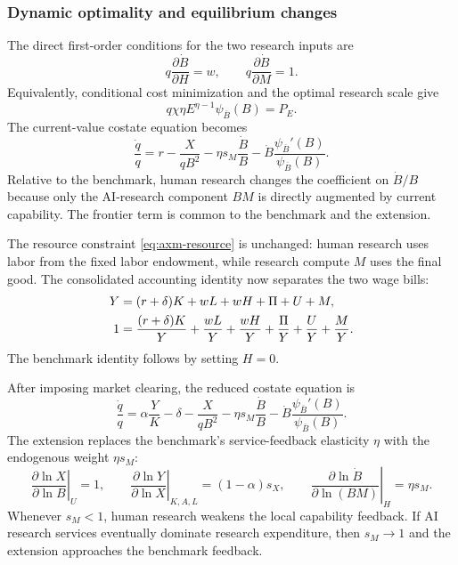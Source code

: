 \subsubsection{Dynamic optimality and equilibrium changes}
\label{sec:axm-dated-equilibrium-system}

The direct first-order conditions for the two research inputs are
\begin{equation}
 q\frac{\partial\dot B}{\partial H}=w,\qquad
 q\frac{\partial\dot B}{\partial M}=1.
 \label{eq:axm-research-focs}
\end{equation}
Equivalently, conditional cost minimization and the optimal research scale give
\begin{equation}
 q\chi\eta E^{\eta-1}\psi_{\overline B}(B)=P_E.
 \label{eq:axm-research-scale-foc}
\end{equation}
The current-value costate equation becomes
\begin{equation}
 \frac{\dot q}{q}=r-\frac{X}{qB^2}
 -\eta s_M\frac{\dot B}{B}
 -\dot B\frac{\psi_{\overline B}'(B)}{
 \psi_{\overline B}(B)}.
 \label{eq:axm-costate}
\end{equation}
Relative to the benchmark, human research changes the coefficient on
\(\dot B/B\) because only the AI-research component \(BM\) is directly
augmented by current capability. The frontier term is common to the benchmark
and the extension.

The resource constraint \eqref{eq:axm-resource} is unchanged: human research
uses labor from the fixed labor endowment, while research compute \(M\) uses the
final good. The consolidated accounting identity now separates the two wage
bills:
\begin{align}
 Y&=(r+\delta)K+wL+wH+\Pi+U+M,\notag\\
 1&=\frac{(r+\delta)K}{Y}+\frac{wL}{Y}+\frac{wH}{Y}
 +\frac{\Pi}{Y}+\frac{U}{Y}+\frac{M}{Y}.
 \label{eq:axm-consolidated-distribution}
\end{align}
The benchmark identity follows by setting \(H=0\).

After imposing market clearing, the reduced costate equation is
\begin{equation}
 \frac{\dot q}{q}=\alpha\frac{Y}{K}-\delta-\frac{X}{qB^2}
 -\eta s_M\frac{\dot B}{B}
 -\dot B\frac{\psi_{\overline B}'(B)}{
 \psi_{\overline B}(B)}.
 \label{eq:axm-costate-reduced}
\end{equation}
The extension replaces the benchmark's service-feedback elasticity \(\eta\)
with the endogenous weight \(\eta s_M\):
\begin{equation}
 \left.\frac{\partial\ln X}{\partial\ln B}\right|_U=1,\qquad
 \left.\frac{\partial\ln Y}{\partial\ln X}\right|_{K,A,L}
 =(1-\alpha)s_X,\qquad
 \left.\frac{\partial\ln\dot B}{\partial\ln(BM)}\right|_H=\eta s_M.
 \label{eq:axm-local-feedback-links}
\end{equation}
Whenever \(s_M<1\), human research weakens the local capability feedback. If
AI research services eventually dominate research expenditure, then
\(s_M\to1\) and the extension approaches the benchmark feedback.

